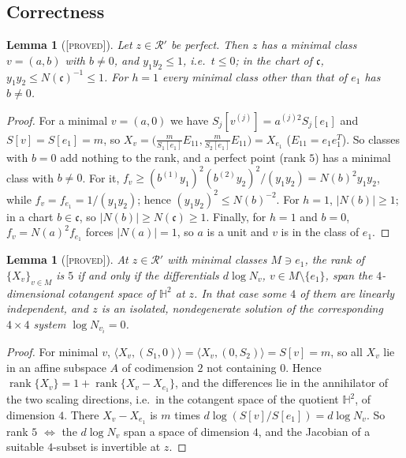 \documentclass[11pt]{amsart}
\newtheorem{lemma}[theorem]{Lemma}
\theoremstyle{definition}
\theoremstyle{remark}
\newcommand{\Hb}{\mathbb{H}}
\newcommand{\PROVED}{\textsc{[proved]}}
\begin{document}
\subsection{Correctness}\label{subsec:correct}

\begin{lemma}[\PROVED]\label{lem:height}
Let $z\in\mathcal R'$ be perfect.  Then $z$ has a minimal class $v=(a,b)$ with $b\ne0$, and
$y_1y_2\le1$, i.e.\ $t\le0$; in the chart of $\mathfrak c$, $y_1y_2\le N(\mathfrak c)^{-1}\le1$.
For $h=1$ every minimal class other than that of $e_1$ has $b\ne0$.
\end{lemma}
\begin{proof}
For a minimal $v=(a,0)$ we have $S_j[v^{(j)}]=a^{(j)2}S_j[e_1]$ and $S[v]=S[e_1]=m$, so
$X_v=\bigl(\tfrac{m}{S_1[e_1]}E_{11},\tfrac{m}{S_2[e_1]}E_{11}\bigr)=X_{e_1}$ ($E_{11}=e_1e_1^T$).
So classes with $b=0$ add nothing to the rank, and a perfect point (rank $5$) has a minimal class
with $b\ne0$.  For it,
$f_v\ge (b^{(1)}y_1)^2(b^{(2)}y_2)^2/(y_1y_2)=N(b)^2y_1y_2$, while $f_v=f_{e_1}=1/(y_1y_2)$;
hence $(y_1y_2)^2\le N(b)^{-2}$.  For $h=1$, $|N(b)|\ge1$; in a chart $b\in\mathfrak c$, so
$|N(b)|\ge N(\mathfrak c)\ge1$.  Finally, for $h=1$ and $b=0$, $f_v=N(a)^2f_{e_1}$ forces
$|N(a)|=1$, so $a$ is a unit and $v$ is in the class of $e_1$.
\end{proof}

\begin{lemma}[\PROVED]\label{lem:rank}
At $z\in\mathcal R'$ with minimal classes $M\ni e_1$, the rank of $\{X_v\}_{v\in M}$ is $5$ if
and only if the differentials $d\log N_v$, $v\in M\setminus\{e_1\}$, span the $4$-dimensional
cotangent space of $\Hb^2$ at $z$.  In that case some $4$ of them are linearly independent,
and $z$ is an isolated, nondegenerate solution of the corresponding $4\times4$ system
$\log N_{v_i}=0$.
\end{lemma}
\begin{proof}
For minimal $v$, $\langle X_v,(S_1,0)\rangle=\langle X_v,(0,S_2)\rangle=S[v]=m$, so all $X_v$
lie in an affine subspace $A$ of codimension $2$ not containing $0$.  Hence
$\operatorname{rank}\{X_v\}=1+\operatorname{rank}\{X_v-X_{e_1}\}$, and the differences lie in
the annihilator of the two scaling directions, i.e.\ in the cotangent space of the quotient
$\Hb^2$, of dimension $4$.  There $X_v-X_{e_1}$ is $m$ times $d\log(S[v]/S[e_1])=d\log N_v$.
So rank $5$ $\iff$ the $d\log N_v$ span a space of dimension $4$, and the Jacobian of a suitable
$4$-subset is invertible at $z$.
\end{proof}
\end{document}
